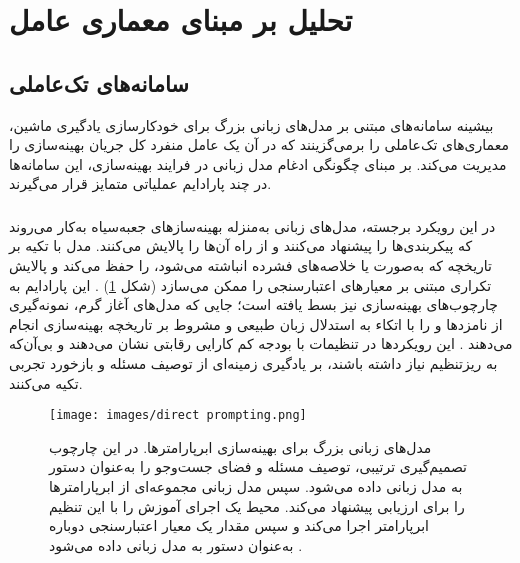 
\section{تحلیل بر مبنای معماری عامل}
\subsection{سامانه‌های تک‌عاملی}

بیشینه سامانه‌های مبتنی بر مدل‌های زبانی بزرگ برای خودکارسازی یادگیری ماشین، معماری‌های تک‌عاملی را برمی‌گزینند که در آن یک عامل منفرد کل جریان بهینه‌سازی را مدیریت می‌کند. بر مبنای چگونگی ادغام مدل زبانی در فرایند بهینه‌سازی، این سامانه‌ها در چند پارادایم عملیاتی متمایز قرار می‌گیرند.

\subsubsection{\protect{}}
در این رویکرد برجسته، مدل‌های زبانی به‌منزله بهینه‌سازهای جعبه‌سیاه به‌کار می‌روند که پیکربندی‌ها را پیشنهاد می‌کنند و از راه  آن‌ها را پالایش می‌کنند. مدل با تکیه بر تاریخچه  که به‌صورت  یا خلاصه‌های فشرده انباشته می‌شود،  را حفظ می‌کند و پالایش تکراری مبتنی بر معیارهای اعتبارسنجی را ممکن می‌سازد (شکل \ref{fig:llm-hpo}) \cite{zhang2023usingLLMforHPO, zheng2023GENIUS}. این پارادایم به چارچوب‌های بهینه‌سازی  نیز بسط یافته است؛ جایی که مدل‌های آغاز گرم، نمونه‌گیری از نامزدها و  را با اتکاء به استدلال زبان طبیعی و مشروط بر تاریخچه بهینه‌سازی انجام می‌دهند \cite{liu2024LLAMBO}. این رویکردها در تنظیمات با بودجه کم کارایی رقابتی نشان می‌دهند و بی‌آن‌که به ریزتنظیم نیاز داشته باشند، بر یادگیری زمینه‌ای از توصیف مسئله و بازخورد تجربی تکیه می‌کنند.
\begin{figure}[h]
\centerline{\texttt{[image: images/direct prompting.png]}}
\caption[مدل زبانیها برای بهینه‌سازی ابرپارامترها]{مدل‌های زبانی بزرگ برای بهینه‌سازی ابرپارامترها. در این چارچوب تصمیم‌گیری ترتیبی، توصیف مسئله و فضای جست‌وجو را به‌عنوان دستور به مدل زبانی داده می‌شود. سپس مدل زبانی مجموعه‌ای از ابرپارامترها را برای ارزیابی پیشنهاد می‌کند. محیط یک اجرای آموزش را با این تنظیم ابرپارامتر اجرا می‌کند و سپس مقدار یک معیار اعتبارسنجی دوباره به‌عنوان دستور به مدل زبانی داده می‌شود \cite{zhang2023usingLLMforHPO}.}
  \label{fig:llm-hpo}
\end{figure}
